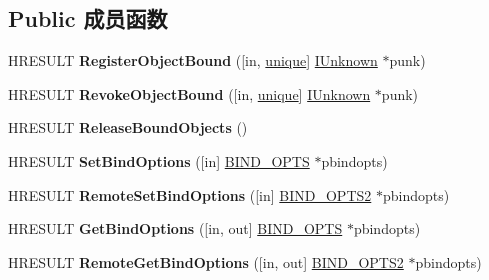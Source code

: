 \subsection*{Public 成员函数}
\begin{DoxyCompactItemize}
\item 
\mbox{\label{interface_i_bind_ctx_a0810211acd6e349372f1bee019d32853}} 
H\+R\+E\+S\+U\+LT {\bfseries Register\+Object\+Bound} (\mbox{[}in, \hyperlink{interfaceunique}{unique}\mbox{]} \hyperlink{interface_i_unknown}{I\+Unknown} $\ast$punk)
\item 
\mbox{\label{interface_i_bind_ctx_a960be9b2bf409adb6f20436b362a90e8}} 
H\+R\+E\+S\+U\+LT {\bfseries Revoke\+Object\+Bound} (\mbox{[}in, \hyperlink{interfaceunique}{unique}\mbox{]} \hyperlink{interface_i_unknown}{I\+Unknown} $\ast$punk)
\item 
\mbox{\label{interface_i_bind_ctx_af0c4dcf4e4f0d2e42fcc4575c10ac0f2}} 
H\+R\+E\+S\+U\+LT {\bfseries Release\+Bound\+Objects} ()
\item 
\mbox{\label{interface_i_bind_ctx_aa58574db20f6611a26df7a15e6dcf9ee}} 
H\+R\+E\+S\+U\+LT {\bfseries Set\+Bind\+Options} (\mbox{[}in\mbox{]} \hyperlink{struct_i_bind_ctx_1_1tag_b_i_n_d___o_p_t_s}{B\+I\+N\+D\+\_\+\+O\+P\+TS} $\ast$pbindopts)
\item 
\mbox{\label{interface_i_bind_ctx_a93beca8ef4c278583140c2d6da70a347}} 
H\+R\+E\+S\+U\+LT {\bfseries Remote\+Set\+Bind\+Options} (\mbox{[}in\mbox{]} \hyperlink{struct_i_bind_ctx_1_1tag_b_i_n_d___o_p_t_s2}{B\+I\+N\+D\+\_\+\+O\+P\+T\+S2} $\ast$pbindopts)
\item 
\mbox{\label{interface_i_bind_ctx_af2d6456703e9f318fd21a3c993c049f2}} 
H\+R\+E\+S\+U\+LT {\bfseries Get\+Bind\+Options} (\mbox{[}in, out\mbox{]} \hyperlink{struct_i_bind_ctx_1_1tag_b_i_n_d___o_p_t_s}{B\+I\+N\+D\+\_\+\+O\+P\+TS} $\ast$pbindopts)
\item 
\mbox{\label{interface_i_bind_ctx_a9016735e5caf828ea259c3b482def2bf}} 
H\+R\+E\+S\+U\+LT {\bfseries Remote\+Get\+Bind\+Options} (\mbox{[}in, out\mbox{]} \hyperlink{struct_i_bind_ctx_1_1tag_b_i_n_d___o_p_t_s2}{B\+I\+N\+D\+\_\+\+O\+P\+T\+S2} $\ast$pbindopts)

\end{DoxyCompactItemize}

